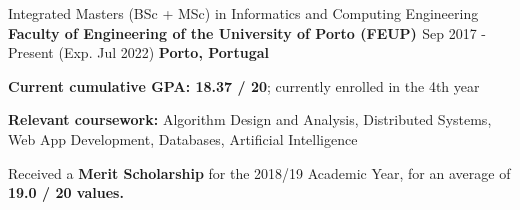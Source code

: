 

\begin{cventries}

  \cventry
    {Integrated Masters (BSc + MSc) in Informatics and Computing Engineering} %
    {\textbf{Faculty of Engineering of the University of Porto (FEUP) \href{https://sigarra.up.pt/feup/en/web_page.inicial}{\faExternalLink}}} %
    {Sep 2017 - Present (Exp. Jul 2022)} %
    {\textbf{Porto, Portugal}} %
    {
      \begin{cvitems} %
        \item {\textbf{Current cumulative GPA: 18.37 / 20}; currently enrolled in the 4th year}
        \item {\textbf{Relevant coursework: } Algorithm Design and Analysis, Distributed Systems, Web App Development, Databases, Artificial Intelligence}
        \item {Received a \textbf{Merit Scholarship} for the 2018/19 Academic Year, for an average of \textbf{19.0 / 20 values.}}
      \end{cvitems}
    }

\end{cventries}

